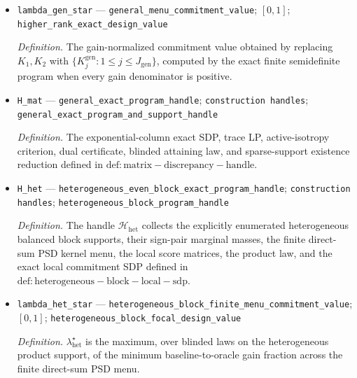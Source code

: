 \documentclass{article}
\begin{document}
\begin{itemize}
  \par\smallskip\noindent\emph{Definition.} \texttt{A finite menu of nonzero positive-\allowbreak{}semidefinite response Gram matrices,\allowbreak{} allowing arbitrary cross-\allowbreak{}block coupling and noncommutativity.}
  \item \texttt{lambda\_\allowbreak{}gen\_\allowbreak{}star} --- \texttt{general\_\allowbreak{}menu\_\allowbreak{}commitment\_\allowbreak{}value}; \([0,1]\); \texttt{higher\_\allowbreak{}rank\_\allowbreak{}exact\_\allowbreak{}design\_\allowbreak{}value}
  \par\smallskip\noindent\emph{Definition.} The gain-normalized commitment value obtained by replacing \(K_1,K_2\) with \(\{K_j^{\mathrm{gen}}:1\le j\le J_{\mathrm{gen}}\}\), computed by the exact finite semidefinite program when every gain denominator is positive.
  \item \texttt{H\_\allowbreak{}mat} --- \texttt{general\_\allowbreak{}exact\_\allowbreak{}program\_\allowbreak{}handle}; \texttt{construction handles}; \texttt{general\_\allowbreak{}exact\_\allowbreak{}program\_\allowbreak{}and\_\allowbreak{}support\_\allowbreak{}handle}
  \par\smallskip\noindent\emph{Definition.} The exponential-column exact SDP, trace LP, active-isotropy criterion, dual certificate, blinded attaining law, and sparse-support existence reduction defined in \(\mathrm{def:matrix-discrepancy-handle}\).
  \item \texttt{H\_\allowbreak{}het} --- \texttt{heterogeneous\_\allowbreak{}even\_\allowbreak{}block\_\allowbreak{}exact\_\allowbreak{}program\_\allowbreak{}handle}; \texttt{construction handles}; \texttt{heterogeneous\_\allowbreak{}block\_\allowbreak{}program\_\allowbreak{}handle}
  \par\smallskip\noindent\emph{Definition.} The handle \(\mathcal H_{\mathrm{het}}\) collects the explicitly enumerated heterogeneous balanced block supports, their sign-pair marginal masses, the finite direct-sum PSD kernel menu, the local score matrices, the product law, and the exact local commitment SDP defined in \(\mathrm{def:heterogeneous-block-local-sdp}\).
  \item \texttt{lambda\_\allowbreak{}het\_\allowbreak{}star} --- \texttt{heterogeneous\_\allowbreak{}block\_\allowbreak{}finite\_\allowbreak{}menu\_\allowbreak{}commitment\_\allowbreak{}value}; \([0,1]\); \texttt{heterogeneous\_\allowbreak{}block\_\allowbreak{}focal\_\allowbreak{}design\_\allowbreak{}value}
  \par\smallskip\noindent\emph{Definition.} \(\lambda_{\mathrm{het}}^\star\) is the maximum, over blinded laws on the heterogeneous product support, of the minimum baseline-to-oracle gain fraction across the finite direct-sum PSD menu.
\end{itemize}
\end{document}
